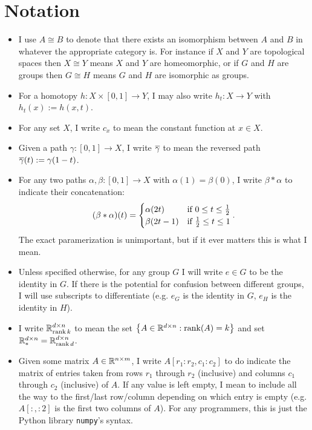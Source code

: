 \section{Notation}
\begin{itemize}
    \item I use $A \cong B$ to denote that there exists an isomorphism between $A$ and $B$ in whatever the appropriate category is.
        For instance if $X$ and $Y$ are topological spaces then $X \cong Y$ means $X$ and $Y$ are homeomorphic, or if $G$ and $H$ are groups then $G \cong H$ means $G$ and $H$ are isomorphic as groups.
    \item For a homotopy $h : X \times [0,1] \to Y$, I may also write $h_t : X \to Y$ with $h_t(x) := h(x,t)$.
    \item For any set $X$, I write $c_x$ to mean the constant function at $x \in X$.
    \item Given a path $\gamma : [0,1] \to X$, I write $\Bar{\gamma}$ to mean the reversed path $\Bar{\gamma}(t) := \gamma(1-t)$.
    \item For any two paths $\alpha, \beta : [0,1] \to X$ with $\alpha(1) = \beta(0)$, I write $\beta \ast \alpha$ to indicate their concatenation:
        \[
            (\beta \ast \alpha)(t) =
            \begin{cases}
                \alpha(2t) &\text{if } 0 \leq t \leq \f12 \\
                \beta(2t-1) &\text{if } \f12 \leq t \leq 1
            \end{cases}.
        \]
        The exact paramerization is unimportant, but if it ever matters this is what I mean.
    \item Unless specified otherwise, for any group $G$ I will write $e \in G$ to be the identity in $G$.
        If there is the potential for confusion between different groups, I will use subscripts to differentiate (e.g. $e_G$ is the identity in $G$, $e_H$ is the identity in $H$).
    \item I write $\R^{d \times n}_{\rank k}$ to mean the set $\set{A \in \R^{d \times n} : \rank(A) = k}$ and set $\R^{d \times n}_* = \R^{d \times n}_{\rank d}$.
    \item Given some matrix $A \in \R^{n \times m}$, I write $A[r_1:r_2,c_1:c_2]$ to do indicate the matrix of entries taken from rows $r_1$ through $r_2$ (inclusive) and columns $c_1$ through $c_2$ (inclusive) of $A$.
        If any value is left empty, I mean to include all the way to the first/last row/column depending on which entry is empty (e.g. $A[:,:2]$ is the first two columns of $A$).
        For any programmers, this is just the Python library \texttt{numpy}'s syntax.
\end{itemize}